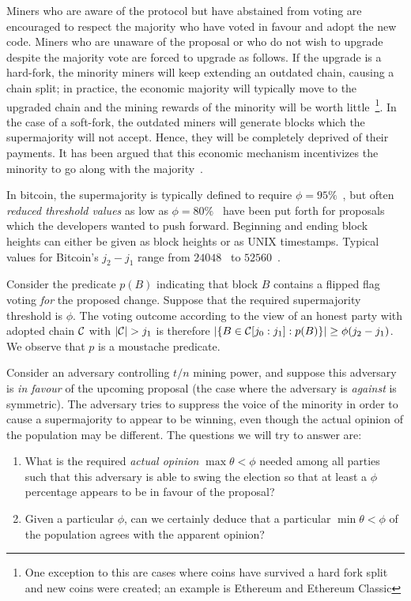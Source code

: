 Miners who are aware of the protocol but have abstained from voting are
encouraged to respect the majority who have voted in favour and adopt the new
code. Miners who are unaware of the proposal or who do not wish to upgrade
despite the majority vote are forced to upgrade as follows. If the upgrade is a
hard-fork, the minority miners will keep extending an outdated chain, causing
a chain split; in practice, the economic majority will typically move to the
upgraded chain and the mining rewards of the minority will be worth
little~\footnote{One exception to this are cases where coins have survived a
hard fork split and new coins were created; an example is Ethereum and Ethereum
Classic}. In the case of a soft-fork, the outdated miners will generate blocks
which the supermajority will not accept. Hence, they will be completely deprived
of their payments. It has been argued that this economic mechanism incentivizes
the minority to go along with the majority~\cite{vitalik-forks}.

In bitcoin, the supermajority is typically defined to require
$\phi = 95\%$~\cite{BIP9}, but often \emph{reduced threshold values} as low as
$\phi = 80\%$~\cite{BIP141} have been put forth for proposals which the
developers wanted to push forward. Beginning and ending block heights can either
be given as block heights or as UNIX timestamps. Typical values for Bitcoin's
$j_2 - j_1$ range from $24048$~\cite{BIP91} to $52560$~\cite{BIP141}.

Consider the predicate $p(B)$ indicating that block $B$ contains a flipped flag
voting \emph{for} the proposed change. Suppose that the required supermajority
threshold is $\phi$. The voting outcome according to the view of an honest party
with adopted chain $\mathcal{C}$ with $|\mathcal{C}| > j_1$ is therefore
$|\{B \in \mathcal{C}[j_0:j_1]: p(B)\}| \geq \phi(j_2 - j_1)$. We observe that $p$ is
a moustache predicate.

Consider an adversary controlling $t / n$ mining power, and suppose this
adversary is \emph{in favour} of the upcoming proposal (the case where the
adversary is \emph{against} is symmetric). The adversary tries to suppress the
voice of the minority in order to cause a supermajority to appear to be winning,
even though the actual opinion of the population may be different. The questions
we will try to answer are:

\begin{enumerate}
  \item What is the required \emph{actual opinion} $\max\theta < \phi$
        needed among all parties such that this adversary is able to swing the
        election so that at least a $\phi$ percentage appears to be in favour of
        the proposal?
  \item Given a particular $\phi$, can we certainly deduce that a particular
        $\min\theta < \phi$ of the population agrees with the apparent opinion?
\end{enumerate}

